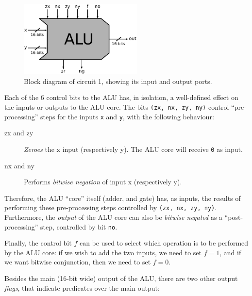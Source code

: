 \documentclass[a4paper]{article}
\begin{document}
            \begin{figure}[h!]
                \begin{center}
                    \includegraphics[width=0.55\textwidth]{imgs/alu-block.pdf}
                \end{center}
                \caption{Block diagram of circuit 1, showing its input and output ports.
                    \label{fig:alu-block}}
            \end{figure}

            Each of the 6 control bits to the ALU has, in isolation, a well-defined effect on the
            inputs or outputs to the ALU core. The bits \texttt{(zx, nx, zy, ny)} control
            ``pre-processing'' steps for the inputs \texttt{x} and \texttt{y}, with the following
            behaviour:

            \begin{description}
                \item[zx and zy] \emph{Zeroes} the x input (respectively y). The ALU core will
                    receive \texttt{0} as input.
                \item[nx and ny] Performs \emph{bitwise negation} of input x (respectively y).
            \end{description}

            Therefore, the ALU ``core'' itself (adder, and gate) has, as inputs, the results of
            performing these pre-processing steps controlled by \texttt{(zx, nx, zy, ny)}.
            Furthermore, the \emph{output} of the ALU core can also be \emph{bitwise negated} as a
            ``post-processing'' step, controlled by bit \texttt{no}.

            Finally, the control bit $f$ can be used to select which operation is to be performed by
            the ALU core: if we wish to add the two inputs, we need to set $f = 1$, and if we want
            bitwise conjunction, then we need to set $f = 0$.

            Besides the main (16-bit wide) output of the ALU, there are two other output
            \emph{flags}, that indicate predicates over the main output:
\end{document}
